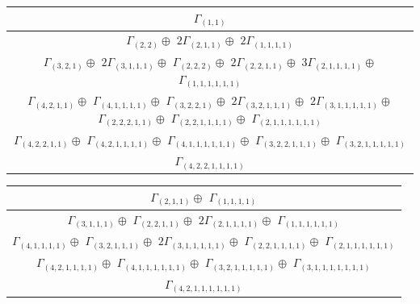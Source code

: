 \documentclass[main.tex]{subfiles}
\begin{document}
\bigskip
\begin{minipage}{1\textwidth}
\centering
\begin{tabular}{c}
$\Gamma_{(
1 , 
1
)}$
\\ \hline
$\Gamma_{(
2 , 
2
)} \oplus$
$ 2 \Gamma_{(
2 , 
1 , 
1
)} \oplus$
$ 2 \Gamma_{(
1 , 
1 , 
1 , 
1
)}$
\\ \hline
$\Gamma_{(
3 , 
2 , 
1
)} \oplus$
$ 2 \Gamma_{(
3 , 
1 , 
1 , 
1
)} \oplus$
$\Gamma_{(
2 , 
2 , 
2
)} \oplus$
$ 2 \Gamma_{(
2 , 
2 , 
1 , 
1
)} \oplus$
$ 3 \Gamma_{(
2 , 
1 , 
1 , 
1 , 
1
)} \oplus$
$\Gamma_{(
1 , 
1 , 
1 , 
1 , 
1 , 
1
)}$
\\ \hline
$\Gamma_{(
4 , 
2 , 
1 , 
1
)} \oplus$
$\Gamma_{(
4 , 
1 , 
1 , 
1 , 
1
)} \oplus$
$\Gamma_{(
3 , 
2 , 
2 , 
1
)} \oplus$
$ 2 \Gamma_{(
3 , 
2 , 
1 , 
1 , 
1
)} \oplus$
$ 2 \Gamma_{(
3 , 
1 , 
1 , 
1 , 
1 , 
1
)} \oplus$
$\Gamma_{(
2 , 
2 , 
2 , 
1 , 
1
)} \oplus$
$\Gamma_{(
2 , 
2 , 
1 , 
1 , 
1 , 
1
)} \oplus$
$\Gamma_{(
2 , 
1 , 
1 , 
1 , 
1 , 
1 , 
1
)}$
\\ \hline
$\Gamma_{(
4 , 
2 , 
2 , 
1 , 
1
)} \oplus$
$\Gamma_{(
4 , 
2 , 
1 , 
1 , 
1 , 
1
)} \oplus$
$\Gamma_{(
4 , 
1 , 
1 , 
1 , 
1 , 
1 , 
1
)} \oplus$
$\Gamma_{(
3 , 
2 , 
2 , 
1 , 
1 , 
1
)} \oplus$
$\Gamma_{(
3 , 
2 , 
1 , 
1 , 
1 , 
1 , 
1
)}$
\\ \hline
$\Gamma_{(
4 , 
2 , 
2 , 
1 , 
1 , 
1 , 
1
)}$
\\
\end{tabular}\end{minipage}
\bigskip
\begin{minipage}{.6\textwidth}
\centering
\begin{tabular}{c}
$\Gamma_{(
2 , 
1 , 
1
)} \oplus$
$\Gamma_{(
1 , 
1 , 
1 , 
1
)}$
\\ \hline
$\Gamma_{(
3 , 
1 , 
1 , 
1
)} \oplus$
$\Gamma_{(
2 , 
2 , 
1 , 
1
)} \oplus$
$ 2 \Gamma_{(
2 , 
1 , 
1 , 
1 , 
1
)} \oplus$
$\Gamma_{(
1 , 
1 , 
1 , 
1 , 
1 , 
1
)}$
\\ \hline
$\Gamma_{(
4 , 
1 , 
1 , 
1 , 
1
)} \oplus$
$\Gamma_{(
3 , 
2 , 
1 , 
1 , 
1
)} \oplus$
$ 2 \Gamma_{(
3 , 
1 , 
1 , 
1 , 
1 , 
1
)} \oplus$
$\Gamma_{(
2 , 
2 , 
1 , 
1 , 
1 , 
1
)} \oplus$
$\Gamma_{(
2 , 
1 , 
1 , 
1 , 
1 , 
1 , 
1
)}$
\\ \hline
$\Gamma_{(
4 , 
2 , 
1 , 
1 , 
1 , 
1
)} \oplus$
$\Gamma_{(
4 , 
1 , 
1 , 
1 , 
1 , 
1 , 
1
)} \oplus$
$\Gamma_{(
3 , 
2 , 
1 , 
1 , 
1 , 
1 , 
1
)} \oplus$
$\Gamma_{(
3 , 
1 , 
1 , 
1 , 
1 , 
1 , 
1 , 
1
)}$
\\ \hline
$\Gamma_{(
4 , 
2 , 
1 , 
1 , 
1 , 
1 , 
1 , 
1
)}$
\\
\end{tabular}\end{minipage}
\end{document}
